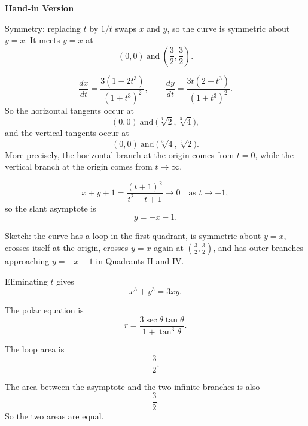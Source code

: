 \documentclass[a4paper,12pt,twocolumn]{article}
\newenvironment{solutionbox}{\begin{framed}}{\end{framed}}
\begin{document}
\begin{solutionbox}
\textbf{Hand-in Version}

\begin{subparts}
\item Symmetry: replacing \(t\) by \(1/t\) swaps \(x\) and \(y\), so the curve is symmetric about \(y=x\). It meets \(y=x\) at
\[
\boxed{(0,0)\ \text{and}\ \left(\frac32,\frac32\right).}
\]

\item
\[
\frac{dx}{dt}=\frac{3(1-2t^3)}{(1+t^3)^2},
\qquad
\frac{dy}{dt}=\frac{3t(2-t^3)}{(1+t^3)^2}.
\]
So the horizontal tangents occur at
\[
\boxed{(0,0)\ \text{and}\ \bigl(\sqrt[3]{2},\sqrt[3]{4}\bigr),}
\]
and the vertical tangents occur at
\[
\boxed{(0,0)\ \text{and}\ \bigl(\sqrt[3]{4},\sqrt[3]{2}\bigr).}
\]
More precisely, the horizontal branch at the origin comes from \(t=0\), while the vertical branch at the origin comes from \(t\to\infty\).

\item
\[
x+y+1=\frac{(t+1)^2}{t^2-t+1}\to0
\quad\text{as }t\to-1,
\]
so the slant asymptote is
\[
\boxed{y=-x-1.}
\]

\item Sketch: the curve has a loop in the first quadrant, is symmetric about \(y=x\), crosses itself at the origin, crosses \(y=x\) again at \(\left(\frac32,\frac32\right)\), and has outer branches approaching \(y=-x-1\) in Quadrants II and IV.

\item Eliminating \(t\) gives
\[
\boxed{x^3+y^3=3xy.}
\]

\item The polar equation is
\[
\boxed{r=\frac{3\sec\theta\tan\theta}{1+\tan^3\theta}.}
\]

\item The loop area is
\[
\boxed{\frac32.}
\]

\item The area between the asymptote and the two infinite branches is also
\[
\boxed{\frac32.}
\]
So the two areas are equal.
\end{subparts}
\end{solutionbox}
\end{document}
